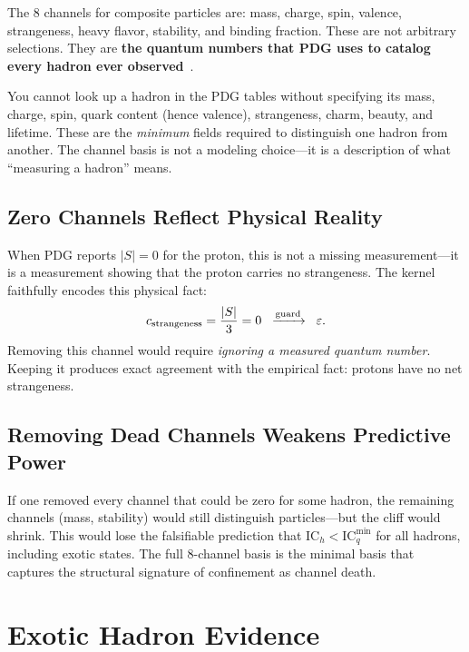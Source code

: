 \documentclass[
  aps,
  prd,
  twocolumn,
  superscriptaddress,
  nofootinbib,
  floatfix
]{revtex4-2}
\newcommand{\eps}{\varepsilon}
\newcommand{\beq}{\begin{equation}}
\newcommand{\eeq}{\end{equation}}
\newcommand{\IC}{\mathrm{IC}}
\begin{document}
The 8 channels for composite particles are:
mass, charge, spin, valence, strangeness, heavy flavor,
stability, and binding fraction.  These are not arbitrary
selections.  They are \textbf{the quantum numbers that PDG uses
to catalog every hadron ever observed}~\cite{pdg2024}.

\begin{warningbox}[title=The Cataloging Constraint]
\small
You cannot look up a hadron in the PDG tables without specifying
its mass, charge, spin, quark content (hence valence), strangeness,
charm, beauty, and lifetime.  These are the \emph{minimum} fields
required to distinguish one hadron from another.  The channel basis
is not a modeling choice---it is a description of what ``measuring
a hadron'' means.
\end{warningbox}

\subsection{Zero Channels Reflect Physical Reality}

When PDG reports $|S| = 0$ for the proton, this is not a
missing measurement---it is a measurement showing that the
proton carries no strangeness.  The kernel faithfully encodes
this physical fact:
\beq
  c_{\rm strangeness} = \frac{|S|}{3} = 0
  \;\;\xrightarrow{\text{guard}}\;\; \eps.
\eeq
Removing this channel would require \emph{ignoring a measured
quantum number}.  Keeping it produces exact agreement with the
empirical fact: protons have no net strangeness.

\subsection{Removing Dead Channels Weakens Predictive Power}

If one removed every channel that could be zero for some hadron,
the remaining channels (mass, stability) would still distinguish
particles---but the cliff would shrink.  This would lose the
falsifiable prediction that $\IC_h < \IC_q^{\min}$ for all
hadrons, including exotic states.  The full 8-channel basis is
the minimal basis that captures the structural signature of
confinement as channel death.


\section{Exotic Hadron Evidence}\label{sec:exotics}
\end{document}
